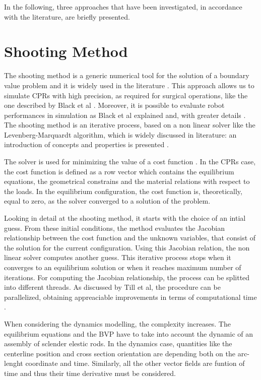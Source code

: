 \documentclass{thesisreport}
\begin{document}
 In the following, three approaches that have been investigated, in accordance with the literature, are briefly presented.
 
 \section{Shooting Method}
 The shooting method is a generic numerical tool for the solution of a boundary value problem and it is widely used in the literature \cite{black_modeling_2017}\cite{black_parallel_2018}\cite{florian_geometrically_2020}. This approach allows us to simulate CPRs with high precision, as required for surgical operations, like the one described by Black et al \cite{black_modeling_2017}. Moreover, it is possible to evaluate robot performances in simulation as Black et al explained \cite{black_parallel_2018} and, with greater details \cite{black_modeling_2017}. The shooting method is an iterative process, based on a non linear solver like the Levenberg-Marquardt algorithm, which is widely discussed in literature: an introduction of concepts and properties is presented \cite{lourakis_brief_nodate}.
  
 The solver is used for minimizing the value of a cost function \cite{florian_geometrically_2020}. In the CPRs case, the cost function is defined as a row vector which contains the equilibrium equations, the geometrical constrains and the material relations with respect to the loads. In the equilibrium configuration, the cost function is, theoretically, equal to zero, as the solver converged to a solution of the problem.
 
 Looking in detail at the shooting method, it starts with the choice of an intial guess. From these initial conditions, the method evaluates the Jacobian relationship between the cost function and the unknown variables, that consist of the solution for the current configuration. Using this Jacobian relation, the non linear solver computes another guess. This iterative process stops when it converges to an equilibrium solution or when it reaches maximum number of iterations. For computing the Jacobian relationship, the process can be splitted into different threads. As discussed by Till et al, the procedure can be parallelized, obtaining appreaciable improvements in terms of computational time \cite{till_efficient_2015}.  
 
 When considering the dynamics modelling, the complexity increases. The equilibrium equations and the BVP have to take into account the dynamic of an assembly of sclender elestic rods. In the dynamics case, quantities like the centerline position and cross section orientation are depending both on the arc-lenght coordinate and time. Similarly, all the other vector fields are funtion of time and thus their time derivative must be considered. 
 
\end{document}
